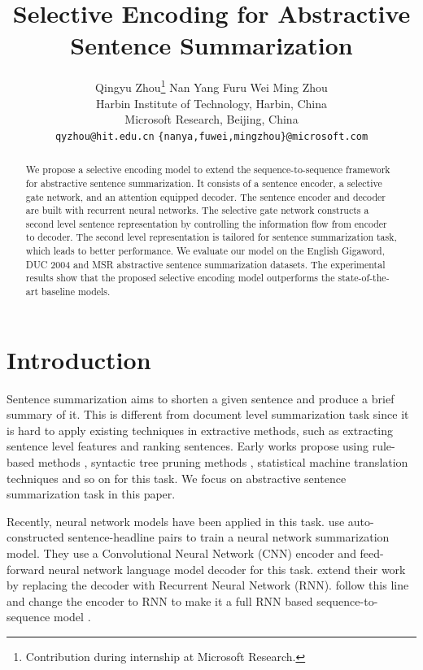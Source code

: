 \documentclass[11pt,a4paper]{article}
\title{Selective Encoding for Abstractive Sentence Summarization}
\author{Qingyu Zhou\thanks{\; Contribution during internship at Microsoft Research.} \hspace{0.15cm} Nan Yang \hspace{0.15cm} Furu Wei \hspace{0.15cm}  Ming Zhou \\
	Harbin Institute of Technology, Harbin, China \\
	Microsoft Research, Beijing, China \\
	{\tt qyzhou@hit.edu.cn} \hspace{0.25cm} {\tt \{nanya,fuwei,mingzhou\}@microsoft.com}
}
\date{}
\begin{document}
\maketitle
\begin{abstract}
	We propose a selective encoding model to extend the sequence-to-sequence framework for abstractive sentence summarization.
	It consists of a sentence encoder, a selective gate network, and an attention equipped decoder.
	The sentence encoder and decoder are built with recurrent neural networks.
	The selective gate network constructs a second level sentence representation by controlling the information flow from encoder to decoder.
	The second level representation is tailored for sentence summarization task, which leads to better performance.
	We evaluate our model on the English Gigaword, DUC 2004 and MSR abstractive sentence summarization datasets.
	The experimental results show that the proposed selective encoding model outperforms the state-of-the-art baseline models.
\end{abstract}

\section{Introduction}

Sentence summarization aims to shorten a given sentence and produce a brief summary of it.
This is different from document level summarization task since it is hard to apply existing techniques in extractive methods, such as extracting sentence level features and ranking sentences.
Early works propose using rule-based methods \citep{zajic2007multi}, syntactic tree pruning methods \citep{knight2002summarization}, statistical machine translation techniques \citep{banko2000headline} and so on for this task.
We focus on abstractive sentence summarization task in this paper.



Recently, neural network models have been applied in this task.
\citet{rush-chopra-weston:2015:EMNLP} use auto-constructed sentence-headline pairs to train a neural network summarization model.
They use a Convolutional Neural Network (CNN) encoder and feed-forward neural network language model decoder for this task.
\citet{chopra-auli-rush:2016:N16-1} extend their work by replacing the decoder with Recurrent Neural Network (RNN).
\citet{nallapatiabstractive} follow this line and change the encoder to RNN to make it a full RNN based sequence-to-sequence model \citep{sutskever2014sequence}.
\end{document}

